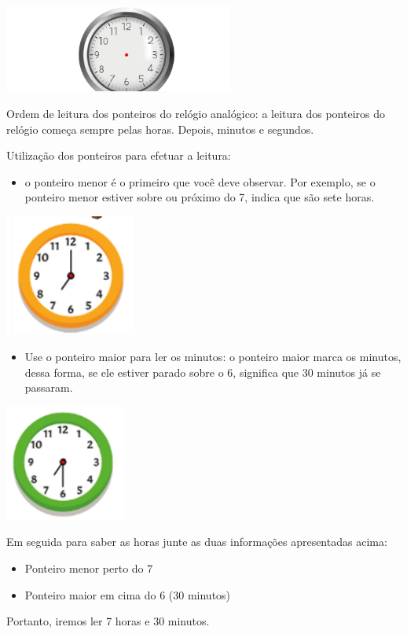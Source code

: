 {\includegraphics[width=2.95833in,height=1.13007in]{media/image48.png}

Ordem de leitura dos ponteiros do relógio analógico: a leitura dos
ponteiros do relógio começa sempre pelas horas. Depois, minutos e
segundos.

Utilização dos ponteiros para efetuar a leitura:

\begin{itemize}
\item
  o ponteiro menor é o primeiro que você deve observar. Por exemplo, se
  o ponteiro menor estiver sobre ou próximo do 7, indica que são sete
  horas.
\end{itemize}

\includegraphics[width=1.69271in,height=1.56563in]{media/image49.png}

\begin{itemize}
\item
  Use o ponteiro maior para ler os minutos: o ponteiro maior marca os
  minutos, dessa forma, se ele estiver parado sobre o 6, significa que
  30 minutos já se passaram.
\end{itemize}

\includegraphics[width=1.57292in,height=1.50032in]{media/image50.png}

Em seguida para saber as horas junte as duas informações apresentadas
acima:

\begin{itemize}
\item
  Ponteiro menor perto do 7
\item
  Ponteiro maior em cima do 6 (30 minutos)
\end{itemize}

Portanto, iremos ler 7 horas e 30 minutos.}


